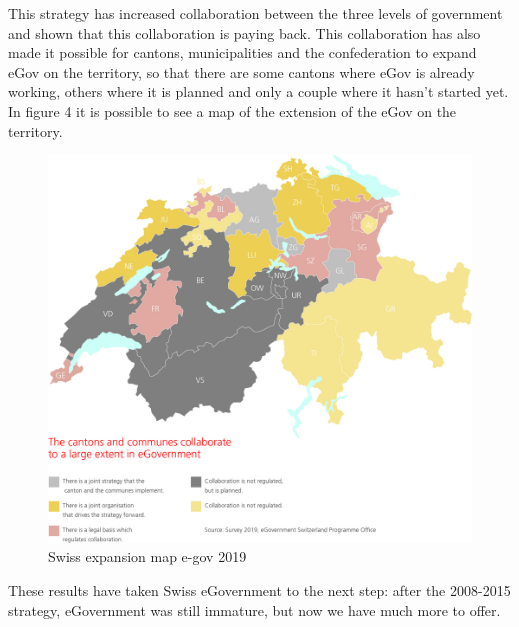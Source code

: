 This strategy has increased collaboration between the three levels of government and shown that this collaboration is paying back.
This collaboration has also made it possible for cantons, municipalities and the confederation to expand eGov on the territory, so that there are some cantons where eGov is already working, others where it is planned and only a couple where it hasn't started yet.
In figure 4 it is possible to see a map of the extension of the eGov on the territory.
\begin{figure}[ht!]
\centering
\includegraphics[width=1\textwidth]{images/survey2019.jpg}
\caption{Swiss expansion map e-gov 2019 \cite{fact2020}}
\label{egov2019}
\end{figure}
\FloatBarrier

These results have taken Swiss eGovernment to the next step: after the 2008-2015 strategy, eGovernment was still immature, but now we have much more to offer.

\newpage
